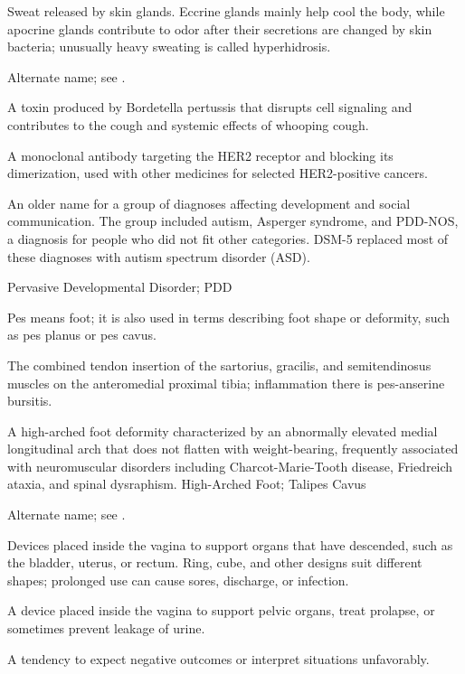  Sweat released by skin glands. Eccrine glands mainly help cool the body, while apocrine glands contribute to odor after their secretions are changed by skin bacteria; unusually heavy sweating is called hyperhidrosis.

 Alternate name; see .

 A toxin produced by Bordetella pertussis that disrupts cell signaling and contributes to the cough and systemic effects of whooping cough.

 A monoclonal antibody targeting the HER2 receptor and blocking its dimerization, used with other medicines for selected HER2-positive cancers.

 An older name for a group of
diagnoses affecting development and social communication. The group included
autism, Asperger syndrome, and PDD-NOS, a diagnosis for people who did not fit
other categories. DSM-5 replaced most of these diagnoses with autism spectrum
disorder (ASD).

\synonyms
Pervasive Developmental Disorder; PDD

 Pes means foot; it is also used in terms describing foot shape or deformity, such as pes planus or pes cavus.

 The combined tendon insertion of the sartorius, gracilis, and semitendinosus muscles on the anteromedial proximal tibia; inflammation there is pes-anserine bursitis.

 A high-arched foot deformity characterized by an abnormally elevated medial longitudinal arch that does not flatten with weight-bearing, frequently associated with neuromuscular disorders including Charcot-Marie-Tooth disease, Friedreich ataxia, and spinal dysraphism.
\synonyms
High-Arched Foot; Talipes Cavus

 Alternate name; see .

 Devices placed inside the vagina to support organs that have descended, such as the bladder, uterus, or rectum. Ring, cube, and other designs suit different shapes; prolonged use can cause sores, discharge, or infection.

 A device placed inside the vagina to support pelvic organs, treat prolapse, or sometimes prevent leakage of urine.

 A tendency to expect negative outcomes or interpret situations unfavorably.

